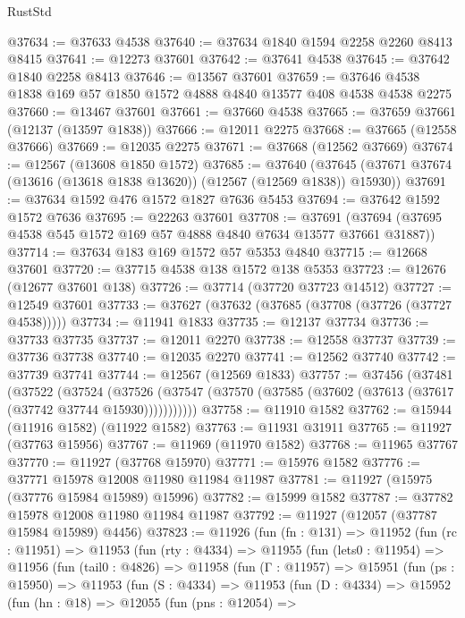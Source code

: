 \begin{lexlean}{RustStd}
\begin{coremodule}
@37634 := @37633 @4538
@37640 := @37634 @1840 @1594 @2258 @2260 @8413 @8415
@37641 := @12273 @37601
@37642 := @37641 @4538
@37645 := @37642 @1840 @2258 @8413
@37646 := @13567 @37601
@37659 := @37646 @4538 @1838 @169 @57 @1850 @1572 @4888 @4840 @13577 @408 @4538 @4538 @2275
@37660 := @13467 @37601
@37661 := @37660 @4538
@37665 := @37659 @37661 (@12137 (@13597 @1838))
@37666 := @12011 @2275
@37668 := @37665 (@12558 @37666)
@37669 := @12035 @2275
@37671 := @37668 (@12562 @37669)
@37674 := @12567 (@13608 @1850 @1572)
@37685 := @37640
    (@37645 (@37671 @37674 (@13616 (@13618 @1838 @13620)) (@12567 (@12569 @1838)) @15930))
@37691 := @37634 @1592 @476 @1572 @1827 @7636 @5453
@37694 := @37642 @1592 @1572 @7636
@37695 := @22263 @37601
@37708 := @37691 (@37694 (@37695 @4538 @545 @1572 @169 @57 @4888 @4840 @7634 @13577 @37661 @31887))
@37714 := @37634 @183 @169 @1572 @57 @5353 @4840
@37715 := @12668 @37601
@37720 := @37715 @4538 @138 @1572 @138 @5353
@37723 := @12676 (@12677 @37601 @138)
@37726 := @37714 (@37720 @37723 @14512)
@37727 := @12549 @37601
@37733 := @37627 (@37632 (@37685 (@37708 (@37726 (@37727 @4538)))))
@37734 := @11941 @1833
@37735 := @12137 @37734
@37736 := @37733 @37735
@37737 := @12011 @2270
@37738 := @12558 @37737
@37739 := @37736 @37738
@37740 := @12035 @2270
@37741 := @12562 @37740
@37742 := @37739 @37741
@37744 := @12567 (@12569 @1833)
@37757 := @37456
    (@37481
      (@37522
        (@37524
          (@37526 (@37547 (@37570 (@37585 (@37602 (@37613 (@37617 (@37742 @37744 @15930)))))))))))
@37758 := @11910 @1582
@37762 := @15944 (@11916 @1582) (@11922 @1582)
@37763 := @11931 @31911
@37765 := @11927 (@37763 @15956)
@37767 := @11969 (@11970 @1582)
@37768 := @11965 @37767
@37770 := @11927 (@37768 @15970)
@37771 := @15976 @1582
@37776 := @37771 @15978 @12008 @11980 @11984 @11987
@37781 := @11927 (@15975 (@37776 @15984 @15989) @15996)
@37782 := @15999 @1582
@37787 := @37782 @15978 @12008 @11980 @11984 @11987
@37792 := @11927 (@12057 (@37787 @15984 @15989) @4456)
@37823 := @11926
    (fun (fn : @131) =>
    @11952
      (fun (rc : @11951) =>
      @11953
        (fun (rty : @4334) =>
        @11955
          (fun (lets0 : @11954) =>
          @11956
            (fun (tail0 : @4826) =>
            @11958
              (fun (Γ : @11957) =>
              @15951
                (fun (ps : @15950) =>
                @11953
                  (fun (S : @4334) =>
                  @11953
                    (fun (D : @4334) =>
                    @15952
                      (fun (hn : @18) =>
                      @12055
                        (fun (pns : @12054) =>

\end{coremodule}
\end{lexlean}

